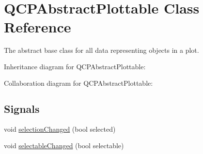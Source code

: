 \hypertarget{class_q_c_p_abstract_plottable}{}\section{Q\+C\+P\+Abstract\+Plottable Class Reference}
\label{class_q_c_p_abstract_plottable}


The abstract base class for all data representing objects in a plot.  




Inheritance diagram for Q\+C\+P\+Abstract\+Plottable\+:


Collaboration diagram for Q\+C\+P\+Abstract\+Plottable\+:
\subsection*{Signals}
\begin{DoxyCompactItemize}
\item 
void \hyperlink{class_q_c_p_abstract_plottable_a3af66432b1dca93b28e00e78a8c7c1d9}{selection\+Changed} (bool selected)
\item 
void \hyperlink{class_q_c_p_abstract_plottable_a0059caa3f3581f3959660fef8cbb71c4}{selectable\+Changed} (bool selectable)
\end{DoxyCompactItemize}
